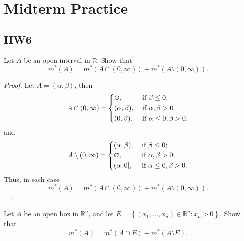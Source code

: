 \chapter{Midterm Practice}
\section{HW6}
\begin{problem}
    Let \(A\) be an open interval in \(\mathbb{R}\). Show that 
    \[
        m^*(A) = m^*(A \cap (0, \infty)) + m^*(A \setminus (0, \infty)).
    \]  
\end{problem}

\begin{proof}
    Let \(A = (\alpha , \beta)\), then 
    \[
        A \cap (0, \infty) = \begin{dcases}
            \varnothing, &\text{ if } \beta \le 0 ;\\
            (\alpha , \beta), &\text{ if } \alpha , \beta > 0 ;\\
            (0 , \beta), &\text{ if } \alpha \le 0, \beta > 0,
        \end{dcases}
    \] 
    and 
    \[
        A \setminus (0, \infty) = \begin{dcases}
            (\alpha , \beta), &\text{ if } \beta \le 0 ;\\
            \varnothing, &\text{ if } \alpha, \beta > 0 ;\\
            (\alpha , 0], &\text{ if } \alpha \le 0, \beta > 0.
        \end{dcases}
    \]
    Thus, in each case 
    \[
        m^*(A) = m^*(A \cap (0, \infty)) + m^*(A \setminus (0, \infty)).
    \]
\end{proof}

\begin{problem}
    Let \(A\) be an open box in \(\mathbb{R} ^n\), and let \(E = \left\{ (x_1, \dots , x_n) \in \mathbb{R} ^n : x_n > 0 \right\} \). Show that 
    \[
        m^*(A) = m^*(A \cap E) + m^*(A \setminus E).
    \]  
\end{problem}


